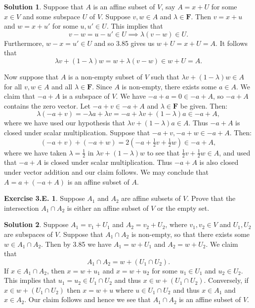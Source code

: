 \documentclass[12pt]{article}
\theoremstyle{definition}
\theoremstyle{exercise}
\newtheorem{exercise}{Exercise 3.E.}
\theoremstyle{solution}
\newtheorem*{solution}{Solution}
\newcommand{\F}{\mathbf{F}}
\begin{document}
\begin{solution}
    Suppose that \( A \) is an affine subset of \( V \), say \( A = x + U \) for some \( x \in V \) and some subspace \( U \) of \( V \). Suppose \( v, w \in A \) and \( \lambda \in \F \). Then \( v = x + u \) and \( w = x + u' \) for some \( u, u' \in U \). This implies that
    \[
        v - w = u - u' \in U \implies \lambda(v - w) \in U.
    \]
    Furthermore, \( w - x = u' \in U \) and so 3.85 gives us \( w + U = x + U = A \). It follows that
    \[
        \lambda v + (1 - \lambda)w = w + \lambda(v - w) \in w + U = A.
    \]

    Now suppose that \( A \) is a non-empty subset of \( V \) such that \( \lambda v + (1 - \lambda) w \in A \) for all \( v, w \in A \) and all \( \lambda \in \F \). Since \( A \) is non-empty, there exists some \( a \in A \). We claim that \( -a + A \) is a subspace of \( V \). We have \( -a + a = 0 \in -a + A \), so \( -a + A \) contains the zero vector. Let \( -a + v \in -a + A \) and \( \lambda \in \F \) be given. Then:
    \[
        \lambda(-a + v) = -\lambda a + \lambda v = -a + \lambda v + (1 - \lambda)a \in -a + A,
    \]
    where we have used our hypothesis that \( \lambda v + (1 - \lambda)a \in A \). Thus \( -a + A \) is closed under scalar multiplication. Suppose that \( -a + v, -a + w \in -a + A \). Then:
    \[
        (-a + v) + (-a + w) = 2 \left( -a + \tfrac{1}{2} v + \tfrac{1}{2} w \right) \in -a + A,
    \]
    where we have taken \( \lambda = \tfrac{1}{2} \) in \( \lambda v + (1 - \lambda)w \) to see that \( \tfrac{1}{2}v + \tfrac{1}{2} w \in A \), and used that \( -a + A \) is closed under scalar multiplication. Thus \( -a + A \) is also closed under vector addition and our claim follows. We may conclude that \( A = a + (-a + A) \) is an affine subset of \( A \).
\end{solution}

\begin{exercise}
\label{ex:9}
    Suppose \( A_1 \) and \( A_2 \) are affine subsets of \( V \). Prove that the intersection \( A_1 \cap A_2 \) is either an affine subset of \( V \) or the empty set.
\end{exercise}

\begin{solution}
    Suppose \( A_1 = v_1 + U_1 \) and \( A_2 = v_2 + U_2 \), where \( v_1, v_2 \in V \) and \( U_1, U_2 \) are subspaces of \( V \). Suppose that \( A_1 \cap A_2 \) is non-empty, so that there exists some \( w \in A_1 \cap A_2 \). Then by 3.85 we have \( A_1 = w + U_1 \) and \( A_2 = w + U_2 \). We claim that
    \[
        A_1 \cap A_2 = w + (U_1 \cap U_2).
    \]
    If \( x \in A_1 \cap A_2 \), then \( x = w + u_1 \) and \( x = w + u_2 \) for some \( u_1 \in U_1 \) and \( u_2 \in U_2 \). This implies that \( u_1 = u_2 \in U_1 \cap U_2 \) and thus \( x \in w + (U_1 \cap U_2) \). Conversely, if \( x \in w + (U_1 \cap U_2) \) then \( x = w + u \) where \( u \in U_1 \cap U_2 \) and thus \( x \in A_1 \) and \( x \in A_2 \). Our claim follows and hence we see that \( A_1 \cap A_2 \) is an affine subset of \( V \).
\end{solution}
\end{document}
